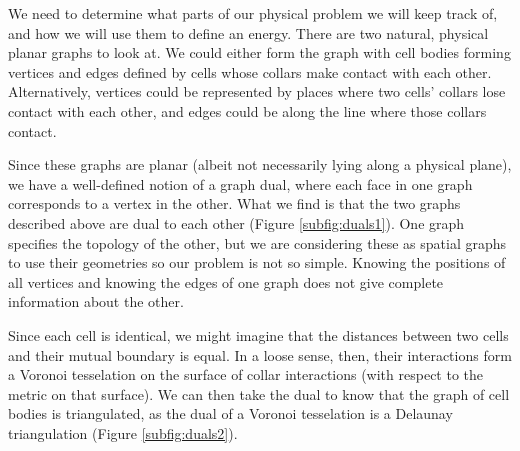 We need to determine what parts of our physical problem we will keep track of, and how we will use them to define an energy. There are two natural, physical planar graphs to look at. We could either form the graph with cell bodies forming vertices and edges defined by cells whose collars make contact with each other. Alternatively, vertices could be represented by places where two cells' collars lose contact with each other, and edges could be along the line where those collars contact. 

Since these graphs are planar (albeit not necessarily lying along a physical plane), we have a well-defined notion of a graph dual, where each face in one graph corresponds to a vertex in the other. What we find is that the two graphs described above are dual to each other (Figure \ref{subfig:duals1}). One graph specifies the topology of the other, but we are considering these as spatial graphs to use their geometries so our problem is not so simple. Knowing the positions of all vertices and knowing the edges of one graph does not give complete information about the other.

Since each cell is identical, we might imagine that the distances between two cells and their mutual boundary is equal. In a loose sense, then, their interactions form a Voronoi tesselation on the surface of collar interactions (with respect to the metric on that surface). We can then take the dual to know that the graph of cell bodies is triangulated, as the dual of a Voronoi tesselation is a Delaunay triangulation (Figure \ref{subfig:duals2}).

